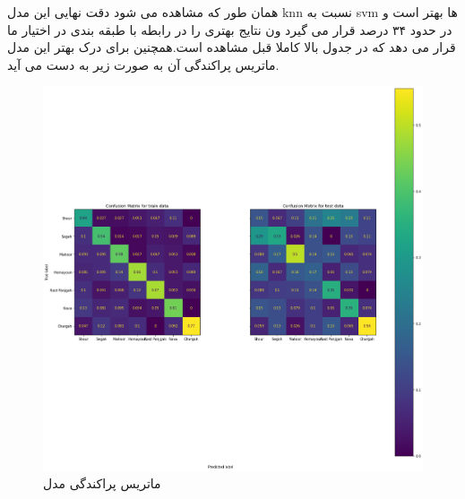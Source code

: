 \documentclass{article}
\begin{document}
\begin{table}[h]
	\centering
	\caption{نتایج  بر روی دیتای test} \label{foo12}
\end{table}
همان طور که مشاهده می شود دقت نهایی این مدل knn نسبت به svm ها بهتر است و در حدود ۳۴ درصد قرار می گیرد ون نتایج بهتری را در رابطه با طبقه بندی در اختیار ما قرار می دهد که در جدول بالا کاملا قبل مشاهده است.همچنین برای درک بهتر این مدل ماتریس پراکندگی آن به صورت زیر به دست می آید.
\begin{figure}[h]
	\centering
	\includegraphics[width=0.5\linewidth]{Photo/22}
	\caption[ماتریس پراکندگی مدل ]{ماتریس پراکندگی مدل }
	\label{fig:22}
\end{figure}
\newpage
\end{document}
